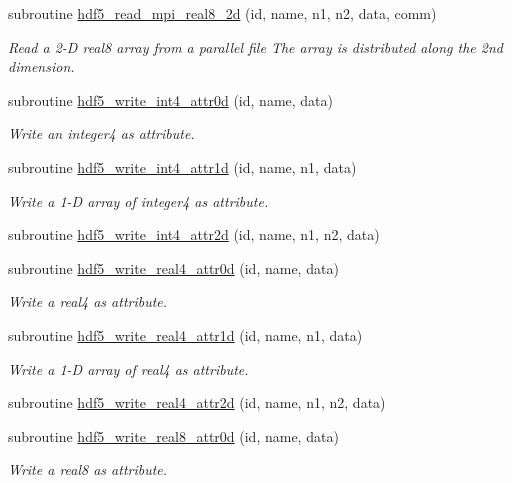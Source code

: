 \begin{DoxyCompactItemize}
subroutine \hyperlink{namespacemodhdf5_a29c6c1a0c3de14678ed8eebe304b3255}{hdf5\+\_\+read\+\_\+mpi\+\_\+real8\+\_\+2d} (id, name, n1, n2, data, comm)
\begin{DoxyCompactList}\small\item\em Read a 2-\/D real8 array from a parallel file The array is distributed along the 2nd dimension. \end{DoxyCompactList}\item 
subroutine \hyperlink{namespacemodhdf5_a1f5aac5704c10accbb39476926a4a7aa}{hdf5\+\_\+write\+\_\+int4\+\_\+attr0d} (id, name, data)
\begin{DoxyCompactList}\small\item\em Write an integer4 as attribute. \end{DoxyCompactList}\item 
subroutine \hyperlink{namespacemodhdf5_a41e511ab23277132cad7aa447804eee4}{hdf5\+\_\+write\+\_\+int4\+\_\+attr1d} (id, name, n1, data)
\begin{DoxyCompactList}\small\item\em Write a 1-\/D array of integer4 as attribute. \end{DoxyCompactList}\item 
subroutine \hyperlink{namespacemodhdf5_a902380b589c35be03e33f0ae8ebdc0dc}{hdf5\+\_\+write\+\_\+int4\+\_\+attr2d} (id, name, n1, n2, data)
\item 
subroutine \hyperlink{namespacemodhdf5_abadf683caad48e7acd96f916246bf778}{hdf5\+\_\+write\+\_\+real4\+\_\+attr0d} (id, name, data)
\begin{DoxyCompactList}\small\item\em Write a real4 as attribute. \end{DoxyCompactList}\item 
subroutine \hyperlink{namespacemodhdf5_a6158884984b6690aad27d75c6d5f58a7}{hdf5\+\_\+write\+\_\+real4\+\_\+attr1d} (id, name, n1, data)
\begin{DoxyCompactList}\small\item\em Write a 1-\/D array of real4 as attribute. \end{DoxyCompactList}\item 
subroutine \hyperlink{namespacemodhdf5_ad682a858bcaec8fcd21f646d44d76208}{hdf5\+\_\+write\+\_\+real4\+\_\+attr2d} (id, name, n1, n2, data)
\item 
subroutine \hyperlink{namespacemodhdf5_a28db26cc0b827091ab455d2419c88b10}{hdf5\+\_\+write\+\_\+real8\+\_\+attr0d} (id, name, data)
\begin{DoxyCompactList}\small\item\em Write a real8 as attribute. \end{DoxyCompactList}\item 

\end{DoxyCompactItemize}
